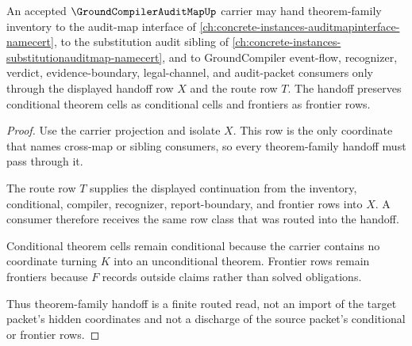 \begin{theorem}
\label{thm:ground-compiler-audit-map-family-handoff}
An accepted $\GroundCompilerAuditMapUp$ carrier may hand theorem-family inventory to the audit-map interface of \autoref{ch:concrete-instances-auditmapinterface-namecert}, to the substitution audit sibling of \autoref{ch:concrete-instances-substitutionauditmap-namecert}, and to GroundCompiler event-flow, recognizer, verdict, evidence-boundary, legal-channel, and audit-packet consumers only through the displayed handoff row $X$ and the route row $T$. The handoff preserves conditional theorem cells as conditional cells and frontiers as frontier rows.
\end{theorem}
\begin{proof}
Use the carrier projection and isolate $X$. This row is the only coordinate that names cross-map or sibling consumers, so every theorem-family handoff must pass through it.

The route row $T$ supplies the displayed continuation from the inventory, conditional, compiler, recognizer, report-boundary, and frontier rows into $X$. A consumer therefore receives the same row class that was routed into the handoff.

Conditional theorem cells remain conditional because the carrier contains no coordinate turning $K$ into an unconditional theorem. Frontier rows remain frontiers because $F$ records outside claims rather than solved obligations.

Thus theorem-family handoff is a finite routed read, not an import of the target packet's hidden coordinates and not a discharge of the source packet's conditional or frontier rows.
\end{proof}

